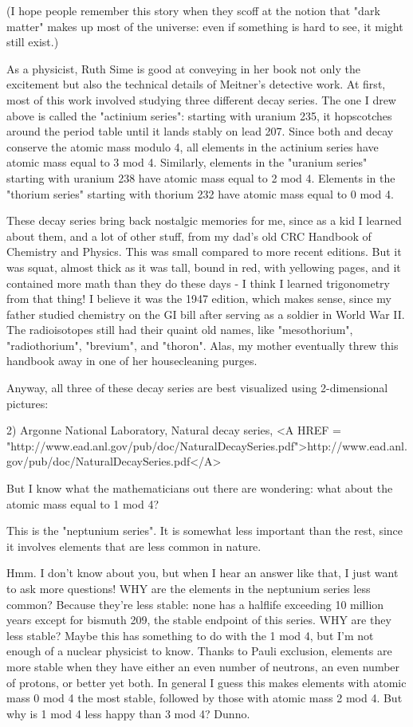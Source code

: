 (I hope people remember this story when they scoff at the notion that
"dark matter" makes up most of the universe: even if something
is hard to see, it might still exist.)


As a physicist, Ruth Sime is good at conveying in her book not only 
the excitement but also the technical details of Meitner's detective
work.  At first, most of this work involved studying three different
decay series.  The one I drew above is called the "actinium
series": starting with uranium 235, it hopscotches around the
period table until it lands stably on lead 207.  Since both \alpha  and
\beta  decay conserve the atomic mass modulo 4, all elements in the
actinium series have atomic mass equal to 3 mod 4.  Similarly,
elements in the "uranium series" starting with uranium 238
have atomic mass equal to 2 mod 4.  Elements in the "thorium
series" starting with thorium 232 have atomic mass equal to 0
mod 4.


These decay series bring back nostalgic memories for me, since as a kid
I learned about them, and a lot of other stuff, from my dad's old CRC
Handbook of Chemistry and Physics.  This was small compared to more
recent editions.  But it was squat, almost thick as it was tall, bound
in red, with yellowing pages, and it contained more math than they do
these days - I think I learned trigonometry from that thing!  I believe
it was the 1947 edition, which makes sense, since my father studied
chemistry on the GI bill after serving as a soldier in World War II.
The radioisotopes still had their quaint old names, like
"mesothorium", "radiothorium", "brevium",
and "thoron".  Alas, my mother eventually threw this handbook
away in one of her housecleaning purges.

Anyway, all three of these decay series are best visualized using
2-dimensional pictures:

2) Argonne National Laboratory, Natural decay series,
<A HREF = "http://www.ead.anl.gov/pub/doc/NaturalDecaySeries.pdf">http://www.ead.anl.gov/pub/doc/NaturalDecaySeries.pdf</A>

But I know what the mathematicians out there are wondering: what about
the atomic mass equal to 1 mod 4?

This is the "neptunium series".  It is somewhat less important
than the rest, since it involves elements that are less common in
nature.

Hmm.  I don't know about you, but when I hear an answer like that, I
just want to ask more questions!  WHY are the elements in the neptunium
series less common?  Because they're less stable: none has a halflife
exceeding 10 million years except for bismuth 209, the stable endpoint
of this series.  WHY are they less stable?  Maybe this has something to
do with the 1 mod 4, but I'm not enough of a nuclear physicist to know.
Thanks to Pauli exclusion, elements are more stable when they have
either an even number of neutrons, an even number of protons, or better
yet both.  In general I guess this makes elements with atomic mass 0
mod 4 the most stable, followed by those with atomic mass 2 mod 4.
But why is 1 mod 4 less happy than 3 mod 4?  Dunno.

